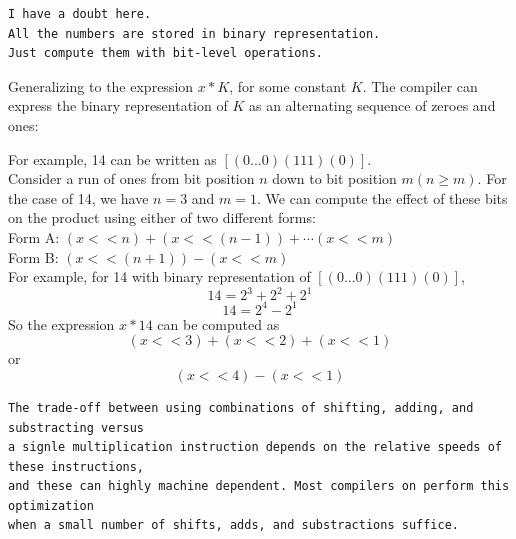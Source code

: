 \documentclass[11pt]{article}
\begin{document}
\begin{verbatim}
I have a doubt here.
All the numbers are stored in binary representation.
Just compute them with bit-level operations.
\end{verbatim}


Generalizing to the expression \(x * K\), for some constant \(K\). The compiler can express the binary representation of \(K\) as an alternating sequence of zeroes and ones:\\
\begin{equation}
[(0...0)(1...1)(0...1)\cdots(1...)]
\end{equation}

For example, 14 can be written as \([(0...0)(111)(0)]\).\\
Consider a run of ones from bit position \(n\) down to bit position \(m (n \ge m)\). For the case of 14, we have \(n=3\) and \(m=1\). We can compute the effect of these bits on the product using either of two different forms:\\
Form A: \((x < < n) + ( x < < (n-1)) + \cdots (x < < m)\)\\
Form B: \((x < < (n+1)) - (x < < m)\)\\


For example, for 14 with binary representation of \([(0...0)(111)(0)]\),\\
\begin{equation}
14 = 2^3 + 2^2 + 2^1 
\end{equation}
\begin{equation}
14 = 2^4 - 2^1
\end{equation}
So the expression \(x * 14\) can be computed as\\
\begin{equation}
(x << 3) + (x << 2) + (x << 1)
\end{equation}
or\\
\begin{equation}
(x << 4) - (x << 1)
\end{equation}

\begin{verbatim}
The trade-off between using combinations of shifting, adding, and substracting versus 
a signle multiplication instruction depends on the relative speeds of these instructions, 
and these can highly machine dependent. Most compilers on perform this optimization 
when a small number of shifts, adds, and substractions suffice.
\end{verbatim}
\end{document}
